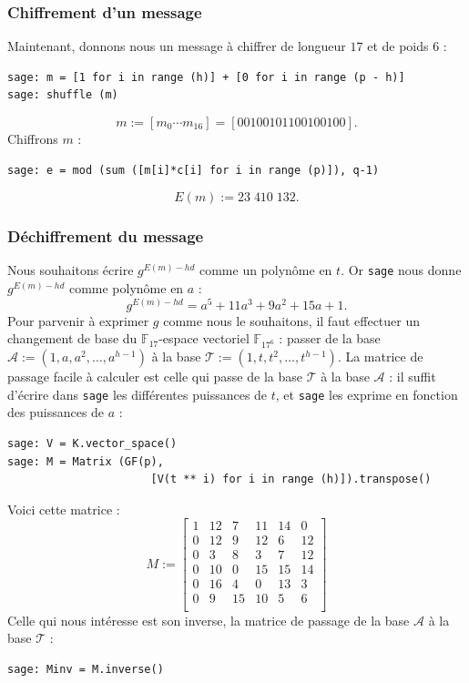 \documentclass[a4paper, titlepage, 11pt]{article}
\theoremstyle{definition}
\theoremstyle{remark}
\def\gf #1{\mathbb{F}_{#1}}
\begin{document}
\subsubsection{Chiffrement d'un message}
Maintenant, donnons nous un message à chiffrer de longueur $17$ et de poids $6$ :
\begin{verbatim}
sage: m = [1 for i in range (h)] + [0 for i in range (p - h)]
sage: shuffle (m)
\end{verbatim}
$$m := [m_0\cdots m_{16}] = [00100101100100100].$$
Chiffrons $m$ :
\begin{verbatim}
sage: e = mod (sum ([m[i]*c[i] for i in range (p)]), q-1)
\end{verbatim}
$$E(m) := 23\;410\;132.$$

\subsubsection{Déchiffrement du message}
Nous souhaitons écrire $g^{E(m) - hd}$ comme un polynôme en $t$. Or \verb|sage| nous donne $g^{E(m) - hd}$ comme polynôme en $a$ : $$g^{E(m) - hd} = a^5 + 11a^3 + 9a^2 + 15a + 1.$$
Pour parvenir à exprimer $g$ comme nous le souhaitons, il faut effectuer un changement de base du $\gf{17}$-espace vectoriel $\gf{17^6}$ : passer de la base $\mathcal{A} := (1, a, a^2, \dots, a^{h-1})$ à la base $\mathcal{T} := (1, t, t^2, \dots, t^{h-1})$.
La matrice de passage facile à calculer est celle qui passe de la base $\mathcal{T}$ à la base $\mathcal{A}$ : il suffit d'écrire dans \verb|sage| les différentes puissances de $t$, et \verb|sage| les exprime en fonction des puissances de $a$ :
\begin{verbatim}
sage: V = K.vector_space()
sage: M = Matrix (GF(p),
                      [V(t ** i) for i in range (h)]).transpose()
\end{verbatim}
Voici cette matrice :
$$M := \left[\begin{array}{cccccc}
1 & 12 & 7 & 11 & 14 & 0 \\
0 & 12 & 9 & 12 & 6 & 12 \\
0 & 3 & 8 & 3 & 7 & 12 \\
0 & 10 & 0 & 15 & 15 & 14 \\
0 & 16 & 4 & 0 & 13 & 3 \\
0 & 9 & 15 & 10 & 5 & 6 \\
\end{array}\right]$$
Celle qui nous intéresse est son inverse, la matrice de passage de la base $\mathcal{A}$ à la base $\mathcal{T}$ :
\begin{verbatim}
sage: Minv = M.inverse()
\end{verbatim}
\end{document}
